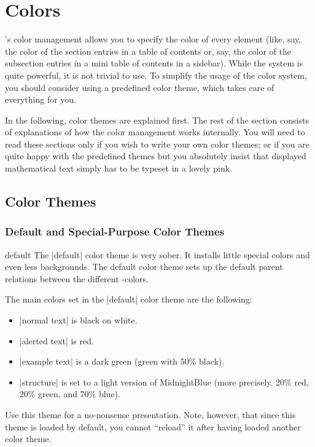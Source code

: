 %

\section{Colors}

\label{section-colors}

\beamer's color management allows you to specify the color of every
element (like, say, the color of the section entries in a table of
contents or, say, the color of the subsection entries in a mini table
of contents in a sidebar). While the system is quite powerful, it is
not trivial to use. To simplify the usage of the color system, you
should consider using a predefined color theme, which takes care of
everything for you.

In the following, color themes are explained first. The rest of the
section consists of explanations of how the color management works
internally. You will need to read these sections only if you wish to
write your own color themes; or if you are quite happy with the
predefined themes but you absolutely insist that displayed
mathematical text simply has to be typeset in a lovely pink.



\subsection{Color Themes}

\subsubsection{Default and Special-Purpose Color Themes}

\begin{colorthemeexample}{default}
  The |default| color theme is very sober. It installs little special
  colors and even less backgrounds. The default color theme sets up
  the default parent relations between the different \beamer-colors.

  The main colors set in the |default| color theme are the following: 
  \begin{itemize}
  \item
    |normal text| is black on white.
  \item
    |alerted text| is red.
  \item
    |example text| is a dark green (green with 50\% black).
  \item
    |structure| is set to a light version of MidnightBlue
    (more precisely, 20\% red, 20\% green, and 70\% blue).  
  \end{itemize}
  Use this theme for a no-nonsense presentation. Note, however, that
  since this theme is loaded by default, you cannot ``reload'' it
  after having loaded another color theme.
\end{colorthemeexample}

